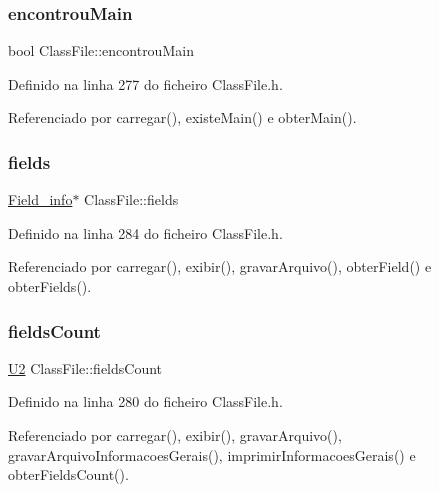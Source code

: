 \subsubsection{\texorpdfstring{encontrou\+Main}{encontrouMain}}
{\footnotesize\ttfamily bool Class\+File\+::encontrou\+Main\hspace{0.3cm}{\ttfamily [private]}}



Definido na linha 277 do ficheiro Class\+File.\+h.



Referenciado por carregar(), existe\+Main() e obter\+Main().

\mbox{\label{classClassFile_a6d6ec8aa668982ea722edc40b3ea5b1a}} 
\subsubsection{\texorpdfstring{fields}{fields}}
{\footnotesize\ttfamily \hyperlink{structField__info}{Field\+\_\+info}$\ast$ Class\+File\+::fields\hspace{0.3cm}{\ttfamily [private]}}



Definido na linha 284 do ficheiro Class\+File.\+h.



Referenciado por carregar(), exibir(), gravar\+Arquivo(), obter\+Field() e obter\+Fields().

\mbox{\label{classClassFile_a5eae2e906695e596b89614df0e4b060a}} 
\subsubsection{\texorpdfstring{fields\+Count}{fieldsCount}}
{\footnotesize\ttfamily \hyperlink{BasicTypes_8h_a90240657108b1b457eef9d3f76e0202e}{U2} Class\+File\+::fields\+Count\hspace{0.3cm}{\ttfamily [private]}}



Definido na linha 280 do ficheiro Class\+File.\+h.



Referenciado por carregar(), exibir(), gravar\+Arquivo(), gravar\+Arquivo\+Informacoes\+Gerais(), imprimir\+Informacoes\+Gerais() e obter\+Fields\+Count().

